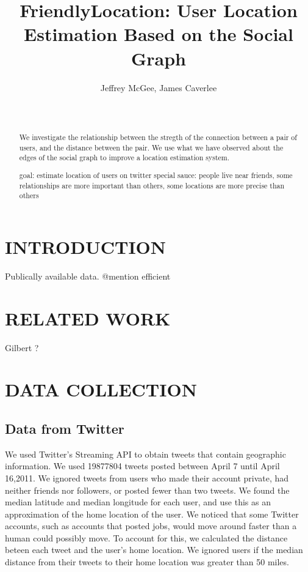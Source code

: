\documentclass{sig-alternate}
\title{FriendlyLocation: User Location Estimation Based on the Social Graph}
\author{
    \alignauthor Jeffrey McGee, James Caverlee\\
    \affaddr{Department of Computer Science and Engineering, Texas A\&M
    University} \\
    \affaddr{ College Station, TX 77845 USA} \\
    \email{jeffamcgee@tamu.edu, caverlee@cse.tamu.edu}
}
\begin{document}
\maketitle
\begin{abstract}
We investigate the relationship between the stregth of the connection between a pair of users, and the distance between the pair.
We use what we have observed about the edges of the social graph to improve a location estimation system.

goal: estimate location of users on twitter
special sauce: people live near friends, some relationships are more important than others, some locations are more precise than others
\end{abstract}




\section{INTRODUCTION}


Publically available data.
@mention
efficient

\section{RELATED WORK}
\cite{scellato2011socio}
\cite{scellato2010distance}
\cite{backstrom2010find}
\cite{cheng2010you}
Gilbert ?


\section{DATA COLLECTION}


\subsection{Data from Twitter}
We used Twitter's Streaming API to obtain tweets that contain geographic information.
We used 19877804 tweets posted between April 7 until April 16,2011.
We ignored tweets from users who made their account private, had neither friends nor followers, or posted fewer than two tweets.
We found the median latitude and median longitude for each user, and use this as an approximation of the home location of the user.
We noticed that some Twitter accounts, such as accounts that posted jobs, would move around faster than a human could possibly move. To account for this, we calculated the distance beteen each tweet and the user's home location. We ignored users if the median distance from their tweets to their home location was greater than 50 miles.
\end{document}
